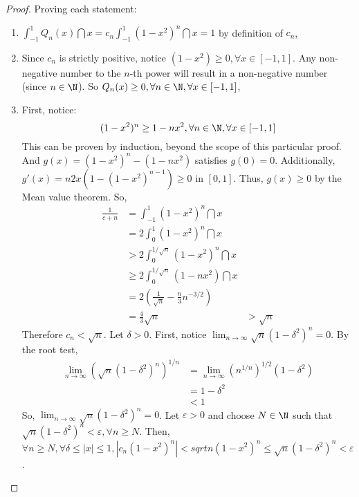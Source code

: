 \begin{proof}
    Proving each statement:
    \begin{enumerate}
        \item $\int_{-1}^1 Q_n(x) \dint x = c_n \int_{-1}^1 (1 - x^2)^n \dint x = 1$ by definition of $c_n$,
        \item Since $c_n$ is strictly positive, notice $(1 - x^2) \geq 0, \forall x \in [-1,1]$. Any non-negative number to the $n$-th power will result in a non-negative number (since $n \in \N $). So $Q_n(x) \geq 0, \forall n \in \N, \forall x \in [-1, 1]$,
        \item First, notice:
            \begin{equation*}
                (1 - x^2)^n \geq 1 - nx^2, \forall n \in \N, \forall x \in [-1, 1]
            \end{equation*}
            This can be proven by induction, beyond the scope of this particular proof. And $g(x) = (1 - x^2)^n - (1 - n x^2)$ satisfies $g(0) = 0$. Additionally, $g'(x) = n 2 x (1 - (1 - x^2)^{n-1}) \geq 0$ in $[0,1]$. Thus, $g(x) \geq 0$ by the Mean value theorem. So,
            \begin{align*}
                \frac{1}{c+n} &= \int_{-1}^1 (1 - x^2)^n \dint x \\
                &= 2 \int_0^1 (1 - x^2)^n \dint x \\
                &> 2 \int_0^{1/\sqrt{n}}(1 - x^2)^n \dint x \\
                &\geq 2 \int_0^{1/\sqrt{n}}(1 - n x^2) \dint x \\
                &= 2 \left(
                    \frac{1}{\sqrt{n}} - \frac{n}{3}n^{-3/2}
                \right) \\
                &= \frac{4}{3}\sqrt{n}
                &>\sqrt{n}
            \end{align*}
            Therefore $c_n < \sqrt{n}$. Let $\delta > 0$. First, notice $\lim_{n \to \infty} \sqrt{n}(1 - \delta^2)^n = 0$. By the root test,
            \begin{align*}
                \lim \limits_{n \to \infty} (\sqrt{n} (1 - \delta^2)^n)^{1/n} &= \lim \limits_{n \to \infty} (n^{1/n})^{1/2}(1 - \delta^2) \\
                &= 1 - \delta^2 \\
                &< 1
            \end{align*}
            So, $\lim_{n \to \infty} \sqrt{n}(1 - \delta^2)^n = 0$. Let $\varepsilon > 0$ and choose $N \in \N$ such that $\sqrt{n}(1 - \delta^2)^n < \varepsilon, \forall n \geq N$. Then, $\forall n \geq N, \forall \delta \leq |x| \leq 1, |c_n(1-x^2)^n| < sqrt{n}(1 - x^2)^n \leq \sqrt{n}(1 - \delta^2)^n < \varepsilon$.
    \end{enumerate}
\end{proof}
